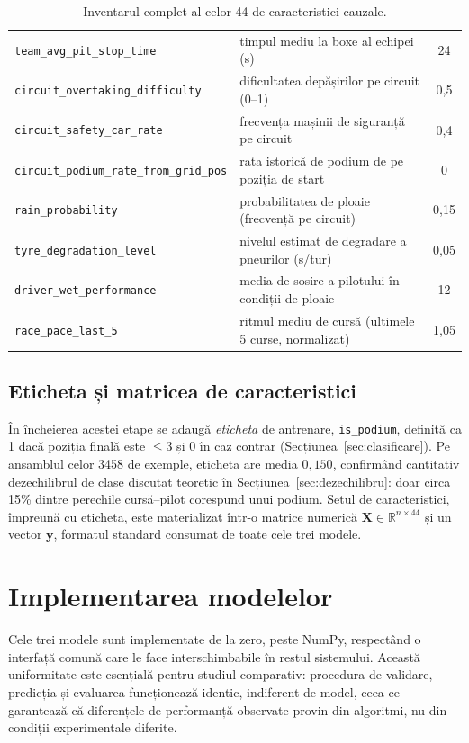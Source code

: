 \documentclass[12pt,a4paper]{report}
\begin{document}
{\begin{table}[htbp]
{\begin{tabular}{l l c}
    \texttt{team\_avg\_pit\_stop\_time} & timpul mediu la boxe al echipei (s)             & 24 \\
    \texttt{circuit\_overtaking\_difficulty} & dificultatea depășirilor pe circuit (0--1) & 0,5 \\
    \texttt{circuit\_safety\_car\_rate} & frecvența mașinii de siguranță pe circuit       & 0,4 \\
    \texttt{circuit\_podium\_rate\_from\_grid\_pos} & rata istorică de podium de pe poziția de start & 0 \\
    \texttt{rain\_probability}          & probabilitatea de ploaie (frecvență pe circuit) & 0,15 \\
    \texttt{tyre\_degradation\_level}   & nivelul estimat de degradare a pneurilor (s/tur) & 0,05 \\
    \texttt{driver\_wet\_performance}   & media de sosire a pilotului în condiții de ploaie & 12 \\
    \texttt{race\_pace\_last\_5}        & ritmul mediu de cursă (ultimele 5 curse, normalizat) & 1,05 \\
    \bottomrule
  \end{tabular}%
  }
  \caption{Inventarul complet al celor 44 de caracteristici cauzale.}
  \label{tab:features_full}
\end{table}
}

\subsection{Eticheta și matricea de caracteristici}

În încheierea acestei etape se adaugă \emph{eticheta} de antrenare, \texttt{is\_podium}, definită ca
1 dacă poziția finală este $\leq 3$ și 0 în caz contrar (Secțiunea~\ref{sec:clasificare}). Pe
ansamblul celor 3458 de exemple, eticheta are media $0{,}150$, confirmând cantitativ dezechilibrul
de clase discutat teoretic în Secțiunea~\ref{sec:dezechilibru}: doar circa 15\% dintre perechile
cursă--pilot corespund unui podium. Setul de caracteristici, împreună cu eticheta, este materializat
într-o matrice numerică $\mathbf{X} \in \mathbb{R}^{n \times 44}$ și un vector $\mathbf{y}$,
formatul standard consumat de toate cele trei modele.

\section{Implementarea modelelor}
\label{sec:implmodele}

Cele trei modele sunt implementate de la zero, peste NumPy, respectând o interfață comună care le
face interschimbabile în restul sistemului. Această uniformitate este esențială pentru studiul
comparativ: procedura de validare, predicția și evaluarea funcționează identic, indiferent de
model, ceea ce garantează că diferențele de performanță observate provin din algoritmi, nu din
condiții experimentale diferite.
\end{document}
